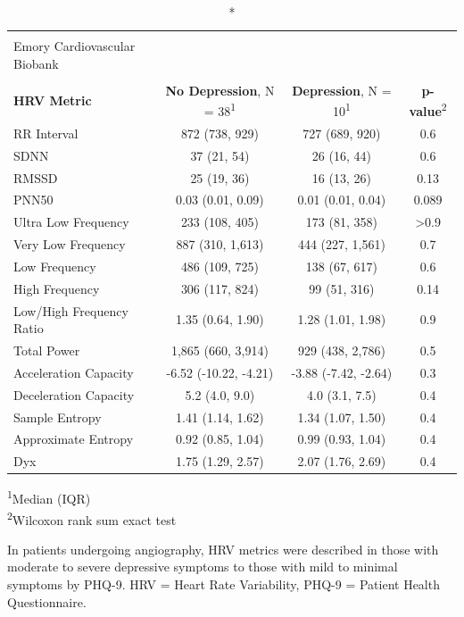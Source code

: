 \documentclass[
  11pt,
  openany]{book}
\begin{document}
\captionsetup[table]{labelformat=empty,skip=1pt}
\begin{longtable}{lccc}
\caption*{
\large HRV and Depression by PHQ-9\\ 
\small Emory Cardiovascular Biobank\\ 
} \\ 
\toprule
\textbf{HRV Metric} & \textbf{No Depression}, N = 38\textsuperscript{1} & \textbf{Depression}, N = 10\textsuperscript{1} & \textbf{p-value}\textsuperscript{2} \\ 
\midrule
RR Interval & 872 (738, 929) & 727 (689, 920) & 0.6 \\ 
SDNN & 37 (21, 54) & 26 (16, 44) & 0.6 \\ 
RMSSD & 25 (19, 36) & 16 (13, 26) & 0.13 \\ 
PNN50 & 0.03 (0.01, 0.09) & 0.01 (0.01, 0.04) & 0.089 \\ 
Ultra Low Frequency & 233 (108, 405) & 173 (81, 358) & >0.9 \\ 
Very Low Frequency & 887 (310, 1,613) & 444 (227, 1,561) & 0.7 \\ 
Low Frequency & 486 (109, 725) & 138 (67, 617) & 0.6 \\ 
High Frequency & 306 (117, 824) & 99 (51, 316) & 0.14 \\ 
Low/High Frequency Ratio & 1.35 (0.64, 1.90) & 1.28 (1.01, 1.98) & 0.9 \\ 
Total Power & 1,865 (660, 3,914) & 929 (438, 2,786) & 0.5 \\ 
Acceleration Capacity & -6.52 (-10.22, -4.21) & -3.88 (-7.42, -2.64) & 0.3 \\ 
Deceleration Capacity & 5.2 (4.0, 9.0) & 4.0 (3.1, 7.5) & 0.4 \\ 
Sample Entropy & 1.41 (1.14, 1.62) & 1.34 (1.07, 1.50) & 0.4 \\ 
Approximate Entropy & 0.92 (0.85, 1.04) & 0.99 (0.93, 1.04) & 0.4 \\ 
Dyx & 1.75 (1.29, 2.57) & 2.07 (1.76, 2.69) & 0.4 \\ 
\bottomrule
\end{longtable}
\vspace{-5mm}
\begin{minipage}{\linewidth}
\textsuperscript{1}Median (IQR) \\ 
\textsuperscript{2}Wilcoxon rank sum exact test \\ 
\end{minipage}
\begin{minipage}{\linewidth}
In patients undergoing angiography, HRV metrics were described in those with moderate to severe depressive symptoms to those with mild to minimal symptoms by PHQ-9. HRV = Heart Rate Variability, PHQ-9 = Patient Health Questionnaire.\\ 
\end{minipage}
\end{document}

